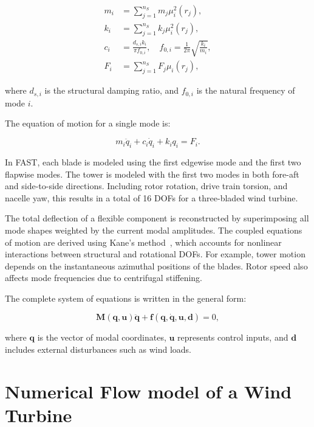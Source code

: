 \begin{align}
    m_i &= \sum_{j=1}^{n_S} m_j \mu_i^2(r_j), \label{eq:modal_mass} \\
    k_i &= \sum_{j=1}^{n_S} k_j \mu_i^2(r_j), \label{eq:modal_stiffness} \\
    c_i &= \frac{d_{s,i} k_i}{\pi f_{0,i}}, \quad f_{0,i} = \frac{1}{2\pi} \sqrt{\frac{k_i}{m_i}}, \label{eq:modal_damping} \\
    F_i &= \sum_{j=1}^{n_S} F_j \mu_i(r_j), \label{eq:modal_force}
\end{align}

where $d_{s,i}$ is the structural damping ratio, and $f_{0,i}$ is the natural frequency of mode $i$.

The equation of motion for a single mode is:

\begin{equation}
    m_i \ddot{q}_i + c_i \dot{q}_i + k_i q_i = F_i. \label{eq:single_mode_eom}
\end{equation}

In FAST, each blade is modeled using the first edgewise mode and the first two flapwise modes. The tower is modeled with the first two modes in both fore-aft and side-to-side directions. Including rotor rotation, drive train torsion, and nacelle yaw, this results in a total of 16 DOFs for a three-bladed wind turbine.

The total deflection of a flexible component is reconstructed by superimposing all mode shapes weighted by the current modal amplitudes. The coupled equations of motion are derived using Kane’s method~\cite{ref:kanes_method}, which accounts for nonlinear interactions between structural and rotational DOFs. For example, tower motion depends on the instantaneous azimuthal positions of the blades. Rotor speed also affects mode frequencies due to centrifugal stiffening.

The complete system of equations is written in the general form:

\begin{equation}
    \mathbf{M}(\mathbf{q}, \mathbf{u}) \ddot{\mathbf{q}} + \mathbf{f}(\mathbf{q}, \dot{\mathbf{q}}, \mathbf{u}, \mathbf{d}) = 0, \label{eq:general_eom}
\end{equation}

where $\mathbf{q}$ is the vector of modal coordinates, $\mathbf{u}$ represents control inputs, and $\mathbf{d}$ includes external disturbances such as wind loads.

\section{Numerical Flow model of a Wind Turbine}
